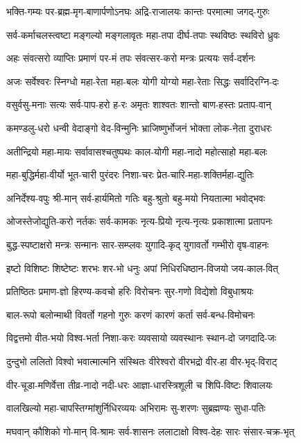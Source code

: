 \twolineshloka
{भक्ति-गम्यः पर-ब्रह्म-मृग-बाणार्पणोऽनघः}
{अद्रि-राजालयः कान्तः परमात्मा जगद्-गुरुः}

\twolineshloka
{सर्व-कर्माचलस्त्वष्टा मङ्गल्यो मङ्गलावृतः}
{महा-तपा दीर्घ-तपाः स्थविष्ठः स्थविरो ध्रुवः}

\twolineshloka
{अहः संवत्सरो व्याप्तिः प्रमाणं पर-मं तपः}
{संवत्सर-करो मन्त्रः प्रत्ययः सर्व-दर्शनः}

\twolineshloka
{अजः सर्वेश्वरः स्निग्धो महा-रेता महा-बलः}
{योगी योग्यो महा-रेताः सिद्धः सर्वादिरग्नि-दः}

\twolineshloka
{वसुर्वसु-मनाः सत्यः सर्व-पाप-हरो ह-रः}
{अमृतः शाश्वतः शान्तो बाण-हस्तः प्रताप-वान्}

\twolineshloka
{कमण्डलु-धरो धन्वी वेदाङ्गो वेद-विन्मुनिः}
{भ्राजिष्णुर्भोजनं भोक्ता लोक-नेता दुराधरः}

\twolineshloka
{अतीन्द्रियो महा-मायः सर्वावासश्चतुष्पथः}
{काल-योगी महा-नादो महोत्साहो महा-बलः}

\twolineshloka
{महा-बुद्धिर्महा-वीर्यो भूत-चारी पुरंदरः}
{निशा-चरः प्रेत-चारि-महा-शक्तिर्महा-द्युतिः}

\twolineshloka
{अनिर्देश्य-वपुः श्री-मान् सर्व-हार्यमितो गतिः}
{बहु-श्रुतो बहु-मयो नियतात्मा भवोद्भवः}

\twolineshloka
{ओजस्तेजोद्युति-करो नर्तकः सर्व-कामकः}
{नृत्य-प्रियो नृत्य-नृत्यः प्रकाशात्मा प्रतापनः}

\twolineshloka
{बुद्ध-स्पष्टाक्षरो मन्त्रः सन्मानः सार-सम्प्लवः}
{युगादि-कृद् युगावर्तो गम्भीरो वृष-वाहनः}

\twolineshloka
{इष्टो विशिष्टः शिष्टेष्टः शरभः शर-भो धनुः}
{अपां निधिरधिष्ठान-विजयो जय-काल-वित्}

\twolineshloka
{प्रतिष्ठितः प्रमाण-ज्ञो हिरण्य-कवचो हरिः}
{विरोचनः सुर-गणो विद्येशो विबुधाश्रयः}

\twolineshloka
{बाल-रूपो बलोन्माथी विवर्तो गहनो गुरुः}
{करणं कारणं कर्ता सर्व-बन्ध-विमोचनः}

\twolineshloka
{विद्वत्तमो वीत-भयो विश्व-भर्ता निशा-करः}
{व्यवसायो व्यवस्थानः स्थान-दो जगदादि-जः}

\twolineshloka
{दुन्दुभो ललितो विश्वो भवात्मात्मनि संस्थितः}
{वीरेश्वरो वीरभद्रो वीर-हा वीर-भृद्-विराट्}

\twolineshloka
{वीर-चूडा-मणिर्वेत्ता तीव्र-नादो नदी-धरः}
{आज्ञा-धारस्त्रिशूली च शिपि-विष्टः शिवालयः}

\twolineshloka
{वालखिल्यो महा-चापस्तिग्मांशुर्निधिरव्ययः}
{अभिरामः सु-शरणः सुब्रह्मण्यः सुधा-पतिः}

\twolineshloka
{मघवान् कौशिको गो-मान् वि-श्रामः सर्व-शासनः}
{ललाटाक्षो विश्व-देहः सारः संसार-चक्र-भृत्}

